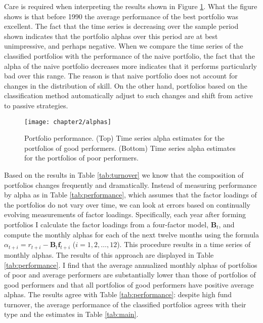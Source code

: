 		Care is required when interpreting the results shown in Figure \ref{fig:performance}.  What the figure shows is that before 1990 the average performance of the best portfolio was excellent.  The fact that the time series is decreasing over the sample period shown indicates that the portfolio alphas over this period are at best unimpressive, and perhaps negative.  When we compare the time series of the classified portfolios with the performance of the naive portfolio, the fact that the alpha of the naive portfolio decreases more indicates that it performs particularly bad over this range. The reason is that naive portfolio does not account for changes in the distribution of skill.  On the other hand, portfolios based on the classification method automatically adjust to such changes and shift from active to passive strategies.

		\begin{figure}[p]
			\small
			\centering
			\texttt{[image: chapter2/alphas]}
			\captionsetup{skip=-20pt, font=footnotesize, justification=justified, width=\textwidth}
			\caption[Portfolio performance]{Portfolio performance. (Top) Time series alpha estimates for the portfolios of good performers. (Bottom) Time series alpha estimates for the portfolios of poor performers.}
			\label{fig:performance}
		\end{figure}

		Based on the results in Table \ref{tab:turnover} we know that the composition of portfolios changes frequently and dramatically.  Instead of measuring performance by alpha as in Table \ref{tab:performance}, which assumes that the factor loadings of the portfolios do not vary over time, we can look at errors based on continually evolving measurements of factor loadings.  Specifically, each year after forming portfolios I calculate the factor loadings from a four-factor model, $\mathbf{B}_t$, and compute the monthly alphas for each of the next twelve months using the formula $\alpha_{t+i} = r_{t+i} - \mathbf{B}_t \mathbf{f}_{t+i}$ ($i=1, 2, \dots, 12$).  This procedure results in a time series of monthly alphas. The results of this approach are displayed in Table \ref{tab:performance}.  I find that the average annualized monthly alphas of portfolios of poor and average performers are substantially lower than those of portfolios of good performers and that all portfolios of good performers have positive average alphas.  The results agree with Table \ref{tab:performance}: despite high fund turnover, the average performance of the classified portfolios agrees with their type and the estimates in Table \ref{tab:main}.

